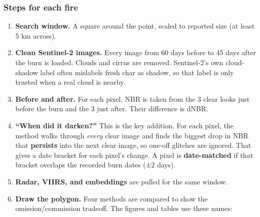 \documentclass[
]{article}
\providecommand{\tightlist}{%
  \setlength{\itemsep}{0pt}\setlength{\parskip}{0pt}}
\begin{document}
\subsubsection{Steps for each fire}\label{steps-for-each-fire}

\begin{enumerate}
\def\labelenumi{\arabic{enumi}.}
\tightlist
\item
  \textbf{Search window.} A square around the point, scaled to reported
  size (at least 5 km across).
\item
  \textbf{Clean Sentinel-2 images.} Every image from 60 days before to
  45 days after the burn is loaded. Clouds and cirrus are removed.
  Sentinel-2's own cloud-shadow label often mislabels fresh char as
  shadow, so that label is only trusted when a real cloud is nearby.
\item
  \textbf{Before and after.} For each pixel, NBR is taken from the 3
  clear looks just before the burn and the 3 just after. Their
  difference is dNBR.
\item
  \textbf{``When did it darken?''} This is the key addition. For each
  pixel, the method walks through \emph{every} clear image and finds the
  biggest drop in NBR that \textbf{persists} into the next clear image,
  so one-off glitches are ignored. That gives a date bracket for each
  pixel's change. A pixel is \textbf{date-matched} if that bracket
  overlaps the recorded burn dates (±2 days).
\item
  \textbf{Radar, VIIRS, and embeddings} are pulled for the same window.
\item
  \textbf{Draw the polygon.} Four methods are compared to show the
  omission/commission tradeoff. The figures and tables use these names:
\end{enumerate}
\end{document}
